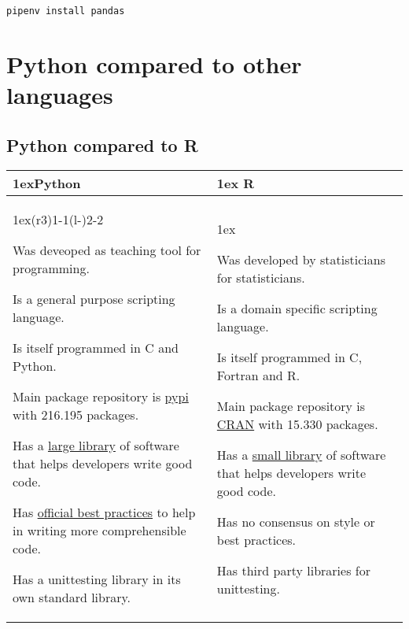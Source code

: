 \documentclass{article}
\begin{document}
\begin{lstlisting}
pipenv install pandas
\end{lstlisting}

\pagebreak
\section{Python compared to other languages}

\subsection{Python compared to R}

\begin{table}[h]
    \begin{tabularx}{\linewidth}{>{\parskip1ex}X@{\kern4\tabcolsep}>{\parskip1ex}X}
        \toprule
        \hfil\bfseries Python
         &
        \hfil\bfseries R
        \\\cmidrule(r{3\tabcolsep}){1-1}\cmidrule(l{-\tabcolsep}){2-2}

        Was deveoped as teaching tool for programming.

        Is a general purpose scripting language.

        Is itself programmed in C and Python.

        Main package repository is \href{https://pypi.org/}{pypi} with 216.195 packages.

        Has a \href{https://github.com/mre/awesome-static-analysis\#python}{large library}
        of software that helps developers write good code.

        Has \href{https://www.python.org/dev/peps/pep-0008/}{official best practices}
        to help in writing more comprehensible code.

        Has a unittesting library in its own standard library.

         &

        Was developed by statisticians for statisticians.

        Is a domain specific scripting language.

        Is itself programmed in C, Fortran and R.

        Main package repository is \href{https://cran.r-project.org/}{CRAN} with 15.330 packages.

        Has a \href{https://github.com/mre/awesome-static-analysis\#r}{small library}
        of software that helps developers write good code.

        Has no consensus on style or best practices.

        Has third party libraries for unittesting.

        \\\bottomrule
    \end{tabularx}
\end{table}
\end{document}
